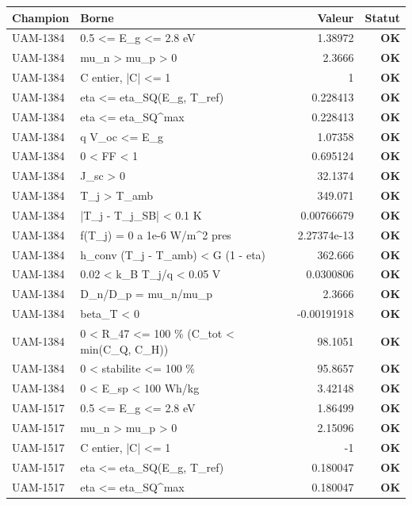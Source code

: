 \documentclass[11pt,a4paper,french]{article}
\begin{document}
\begin{table}[htbp]\centering\footnotesize
\begin{tabular}{llrr}
\toprule
Champion & Borne & Valeur & Statut \\
\midrule
UAM-1384 & 0.5 <= E\_g <= 2.8 eV & 1.38972 & \textbf{OK} \\
UAM-1384 & mu\_n > mu\_p > 0 & 2.3666 & \textbf{OK} \\
UAM-1384 & C entier, |C| <= 1 & 1 & \textbf{OK} \\
UAM-1384 & eta <= eta\_SQ(E\_g, T\_ref) & 0.228413 & \textbf{OK} \\
UAM-1384 & eta <= eta\_SQ\textasciicircum{}max & 0.228413 & \textbf{OK} \\
UAM-1384 & q V\_oc <= E\_g & 1.07358 & \textbf{OK} \\
UAM-1384 & 0 < FF < 1 & 0.695124 & \textbf{OK} \\
UAM-1384 & J\_sc > 0 & 32.1374 & \textbf{OK} \\
UAM-1384 & T\_j > T\_amb & 349.071 & \textbf{OK} \\
UAM-1384 & |T\_j - T\_j\_SB| < 0.1 K & 0.00766679 & \textbf{OK} \\
UAM-1384 & f(T\_j) = 0 a 1e-6 W/m\textasciicircum{}2 pres & 2.27374e-13 & \textbf{OK} \\
UAM-1384 & h\_conv (T\_j - T\_amb) < G (1 - eta) & 362.666 & \textbf{OK} \\
UAM-1384 & 0.02 < k\_B T\_j/q < 0.05 V & 0.0300806 & \textbf{OK} \\
UAM-1384 & D\_n/D\_p = mu\_n/mu\_p & 2.3666 & \textbf{OK} \\
UAM-1384 & beta\_T < 0 & -0.00191918 & \textbf{OK} \\
UAM-1384 & 0 < R\_47 <= 100 \% (C\_tot < min(C\_Q, C\_H)) & 98.1051 & \textbf{OK} \\
UAM-1384 & 0 < stabilite <= 100 \% & 95.8657 & \textbf{OK} \\
UAM-1384 & 0 < E\_sp < 100 Wh/kg & 3.42148 & \textbf{OK} \\
UAM-1517 & 0.5 <= E\_g <= 2.8 eV & 1.86499 & \textbf{OK} \\
UAM-1517 & mu\_n > mu\_p > 0 & 2.15096 & \textbf{OK} \\
UAM-1517 & C entier, |C| <= 1 & -1 & \textbf{OK} \\
UAM-1517 & eta <= eta\_SQ(E\_g, T\_ref) & 0.180047 & \textbf{OK} \\
UAM-1517 & eta <= eta\_SQ\textasciicircum{}max & 0.180047 & \textbf{OK} \\

\end{tabular}
\end{table}
\end{document}
